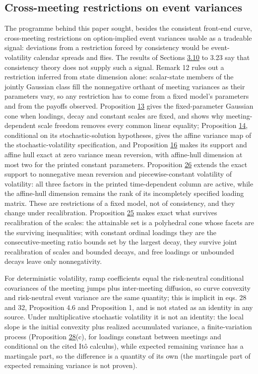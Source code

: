 \documentclass[11pt]{article}
\begin{document}
\subsection{Cross-meeting restrictions on event variances}\label{sec:5.3}

The programme behind this paper sought, besides the consistent front-end curve, cross-meeting restrictions on option-implied event variances usable as a tradeable signal: deviations from a restriction forced by consistency would be event-volatility calendar spreads and flies. The results of Sections \hyperref[sec:3.10]{3.10} to 3.23 say that consistency theory does not supply such a signal. Remark 12 rules out a restriction inferred from state dimension alone: scalar-state members of the jointly Gaussian class fill the nonnegative orthant of meeting variances as their parameters vary, so any restriction has to come from a fixed model's parameters and from the payoffs observed. Proposition \hyperref[res:Proposition-13]{13} gives the fixed-parameter Gaussian cone when loadings, decay and constant scales are fixed, and shows why meeting-dependent scale freedom removes every common linear equality; Proposition \hyperref[res:Proposition-14]{14}, conditional on its stochastic-solution hypotheses, gives the affine variance map of the stochastic-volatility specification, and Proposition \hyperref[res:Proposition-16]{16} makes its support and affine hull exact at zero variance mean reversion, with affine-hull dimension at most two for the printed constant parameters. Proposition \hyperref[res:Proposition-26]{26} extends the exact support to nonnegative mean reversion and piecewise-constant volatility of volatility: all three factors in the printed time-dependent column are active, while the affine-hull dimension remains the rank of its incompletely specified loading matrix. These are restrictions of a fixed model, not of consistency, and they change under recalibration. Proposition \hyperref[res:Proposition-25]{25} makes exact what survives recalibration of the scales: the attainable set is a polyhedral cone whose facets are the surviving inequalities; with constant ordinal loadings they are the consecutive-meeting ratio bounds set by the largest decay, they survive joint recalibration of scales and bounded decays, and free loadings or unbounded decays leave only nonnegativity.

For deterministic volatility, ramp coefficients equal the risk-neutral conditional covariances of the meeting jumps plus inter-meeting diffusion, so curve convexity and risk-neutral event variance are the same quantity; this is implicit in \cite{gellert2021short} eqs. 28 and 32, \cite{fontana2022term} Proposition 4.6 and \cite{kim2014jumps} Proposition 1, and is not stated as an identity in any source. Under multiplicative stochastic volatility it is not an identity: the local slope is the initial convexity plus realized accumulated variance, a finite-variation process (Proposition \hyperref[res:Proposition-28]{28}(c), for loadings constant between meetings and conditional on the cited Itô calculus), while expected remaining variance has a martingale part, so the difference is a quantity of its own (the martingale part of expected remaining variance is not proven).
\end{document}
